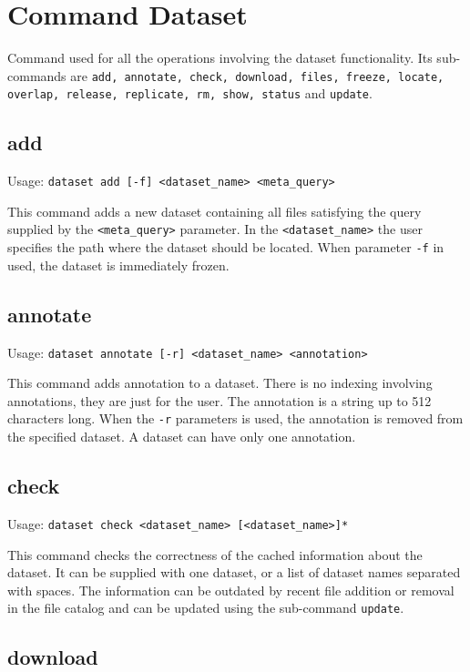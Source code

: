 \section{Command Dataset}
Command used for all the operations involving the dataset
functionality. Its sub-commands are \texttt{add, annotate, check,
download, files, freeze, locate, overlap, release, replicate, rm,
show, status} and \texttt{update}.

\subsection{add}

Usage: \texttt{dataset add [-f] <dataset\_name> <meta\_query>}

This command adds a new dataset containing all files satisfying the query
supplied by the \texttt{<meta\_query>} parameter. In the
\texttt{<dataset\_name>} the user specifies the path where the
dataset should be located. When parameter \texttt{-f} in used, the
dataset is immediately frozen.

\subsection{annotate}

Usage: \texttt{dataset annotate [-r] <dataset\_name> <annotation>}

This command adds annotation to a dataset. There is no indexing involving
annotations, they are just for the user. The annotation is a string
up to 512 characters long. When the \texttt{-r} parameters is used,
the annotation is removed from the specified dataset. A dataset can
have only one annotation.

\subsection{check}

Usage: \texttt{dataset check <dataset\_name> [<dataset\_name>]*}

This command checks the correctness of the cached information about the dataset.
It can be supplied with one dataset, or a list of dataset names
separated with spaces. The information can be outdated by recent
file addition or removal in the file catalog and can be updated
using the sub-command \texttt{update}.

\subsection{download}

